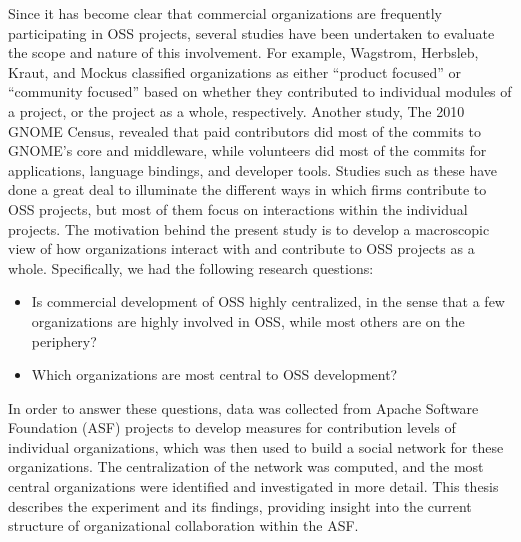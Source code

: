Since it has become clear that commercial organizations are frequently participating in OSS projects, several studies have been undertaken to evaluate the scope and nature of this involvement. For example, Wagstrom, Herbsleb, Kraut, and Mockus \cite{wagstrom2010impact} classified organizations as either ``product focused'' or ``community focused'' based on whether they contributed to individual modules of a project, or the project as a whole, respectively. Another study, The 2010 GNOME Census\cite{neary2010gnome}, revealed that paid contributors did most of the commits to GNOME's core and middleware, while volunteers did most of the commits for applications, language bindings, and developer tools. Studies such as these have done a great deal to illuminate the different ways in which firms contribute to OSS projects, but most of them focus on interactions within the individual projects. The motivation behind the present study is to develop a macroscopic view of how organizations interact with and contribute to OSS projects as a whole. Specifically, we had the following research questions:
\begin{itemize}
	\item Is commercial development of OSS highly centralized, in the sense that a few organizations are highly involved in OSS, while most others are on the periphery?
	\item Which organizations are most central to OSS development?
\end{itemize}
In order to answer these questions, data was collected from Apache Software Foundation (ASF) projects to develop measures for contribution levels of individual organizations, which was then used to build a social network for these organizations. The centralization of the network was computed, and the most central organizations were identified and investigated in more detail. This thesis describes the experiment and its findings, providing insight into the current structure of organizational collaboration within the ASF.

